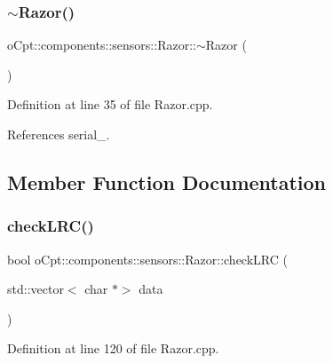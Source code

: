 \subsubsection{\texorpdfstring{$\sim$\+Razor()}{~Razor()}}
{\footnotesize\ttfamily o\+Cpt\+::components\+::sensors\+::\+Razor\+::$\sim$\+Razor (\begin{DoxyParamCaption}{ }\end{DoxyParamCaption})}



Definition at line 35 of file Razor.\+cpp.



References serial\+\_\+.



\subsection{Member Function Documentation}
\hypertarget{classo_cpt_1_1components_1_1sensors_1_1_razor_a0905dcac63406a3885fa8c2d0e952a39}{}\label{classo_cpt_1_1components_1_1sensors_1_1_razor_a0905dcac63406a3885fa8c2d0e952a39} 
\subsubsection{\texorpdfstring{check\+L\+R\+C()}{checkLRC()}}
{\footnotesize\ttfamily bool o\+Cpt\+::components\+::sensors\+::\+Razor\+::check\+L\+RC (\begin{DoxyParamCaption}\item[{std\+::vector$<$ char $\ast$$>$}]{data }\end{DoxyParamCaption})\hspace{0.3cm}{\ttfamily [private]}}



Definition at line 120 of file Razor.\+cpp.

\hypertarget{classo_cpt_1_1components_1_1sensors_1_1_razor_a1c058bfc9483cfcf94456d498bff380e}{}\label{classo_cpt_1_1components_1_1sensors_1_1_razor_a1c058bfc9483cfcf94456d498bff380e} 
